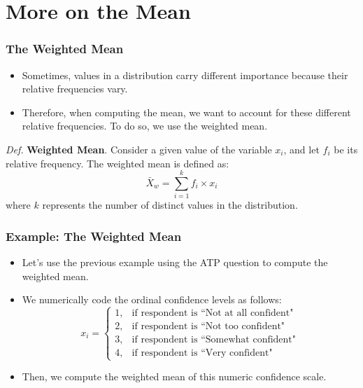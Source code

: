 \documentclass[handout]{beamer} %
\begin{document}
\section{More on the Mean}

\begin{frame}
\frametitle{The Weighted Mean}
\begin{itemize}
    \item Sometimes, values in a distribution carry different importance because their relative frequencies vary.
    \item Therefore, when computing the mean, we want to account for these different relative frequencies. To do so, we use the weighted mean.
    \vspace{1em}
\end{itemize}
\emph{Def.} \textbf{Weighted Mean}.  
Consider a given value of the variable \( x_i \), and let \( f_i \) be its relative frequency. The weighted mean is defined as:
\begin{equation*}
\bar{X}_w = \sum_{i=1}^{k} f_i \times x_i
\end{equation*}
where \( k \) represents the number of distinct values in the distribution.
\end{frame}


\begin{frame}
\frametitle{Example: The Weighted Mean}
\begin{itemize}
    \item Let’s use the previous example using the ATP question to compute the weighted mean.
    \item We numerically code the ordinal confidence levels as follows:
    \[
    x_i =
    \begin{cases} 
        1, & \text{if respondent is ``Not at all confident"} \\
        2, & \text{if respondent is ``Not too confident"} \\
        3, & \text{if respondent is ``Somewhat confident"} \\
        4, & \text{if respondent is ``Very confident"} 
    \end{cases}
    \]
    \item Then, we compute the weighted mean of this numeric confidence scale.
\end{itemize}
\end{frame}
\end{document}
